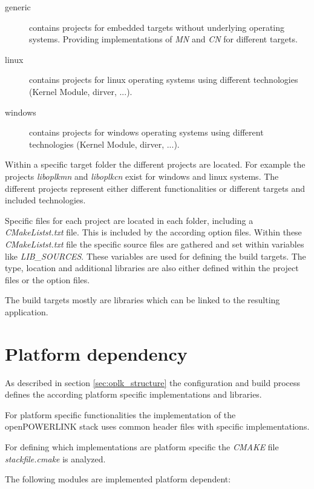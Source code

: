 \begin{description}
    \item[generic] contains projects for embedded targets without underlying operating systems.
    Providing implementations of \emph{MN} and \emph{CN} for different targets.
    \item[linux] contains projects for linux operating systems using different technologies (Kernel Module, dirver, ...).
    \item[windows] contains projects for windows operating systems using different technologies (Kernel Module, dirver, ...).
\end{description}

Within a specific target folder the different projects are located.
For example the projects \emph{liboplkmn} and \emph{liboplkcn} exist for windows and linux systems.
The different projects represent either different functionalities or different targets and included technologies.

Specific files for each project are located in each folder, including a \emph{CMakeListst.txt} file.
This is included by the according option files.
Within these \emph{CMakeListst.txt} file the specific source files are gathered and set within variables like \emph{LIB\_SOURCES}.
These variables are used for defining the build targets.
The type, location and additional libraries are also either defined within the project files or the option files.

The build targets mostly are libraries which can be linked to the resulting application.

\section{Platform dependency}
\label{sec:oplk_platform}
As described in section \ref{sec:oplk_structure} the configuration and build process defines the according platform specific implementations and libraries.

For platform specific functionalities the implementation of the openPOWERLINK stack uses common header files with specific implementations.

For defining which implementations are platform specific the \emph{CMAKE} file \emph{stackfile.cmake} is analyzed.

The following modules are implemented platform dependent:

